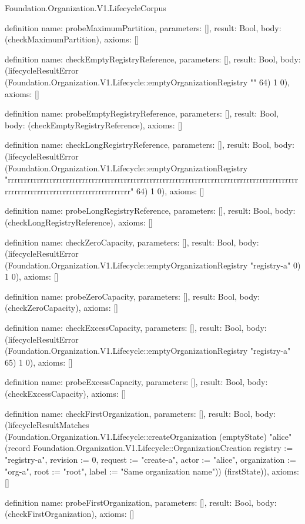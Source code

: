 \begin{lexlean}{Foundation.Organization.V1.LifecycleCorpus}
\begin{semanticmodule}
definition{
  name: probeMaximumPartition,
  parameters: [],
  result: Bool,
  body: (checkMaximumPartition),
  axioms: []
}

definition{
  name: checkEmptyRegistryReference,
  parameters: [],
  result: Bool,
  body: (lifecycleResultError (Foundation.Organization.V1.Lifecycle::emptyOrganizationRegistry "" 64) 1 0),
  axioms: []
}

definition{
  name: probeEmptyRegistryReference,
  parameters: [],
  result: Bool,
  body: (checkEmptyRegistryReference),
  axioms: []
}

definition{
  name: checkLongRegistryReference,
  parameters: [],
  result: Bool,
  body: (lifecycleResultError (Foundation.Organization.V1.Lifecycle::emptyOrganizationRegistry "rrrrrrrrrrrrrrrrrrrrrrrrrrrrrrrrrrrrrrrrrrrrrrrrrrrrrrrrrrrrrrrrrrrrrrrrrrrrrrrrrrrrrrrrrrrrrrrrrrrrrrrrrrrrrrrrrrrrrrrrrrrrrrrrr" 64) 1 0),
  axioms: []
}

definition{
  name: probeLongRegistryReference,
  parameters: [],
  result: Bool,
  body: (checkLongRegistryReference),
  axioms: []
}

definition{
  name: checkZeroCapacity,
  parameters: [],
  result: Bool,
  body: (lifecycleResultError (Foundation.Organization.V1.Lifecycle::emptyOrganizationRegistry "registry-a" 0) 1 0),
  axioms: []
}

definition{
  name: probeZeroCapacity,
  parameters: [],
  result: Bool,
  body: (checkZeroCapacity),
  axioms: []
}

definition{
  name: checkExcessCapacity,
  parameters: [],
  result: Bool,
  body: (lifecycleResultError (Foundation.Organization.V1.Lifecycle::emptyOrganizationRegistry "registry-a" 65) 1 0),
  axioms: []
}

definition{
  name: probeExcessCapacity,
  parameters: [],
  result: Bool,
  body: (checkExcessCapacity),
  axioms: []
}

definition{
  name: checkFirstOrganization,
  parameters: [],
  result: Bool,
  body: (lifecycleResultMatches (Foundation.Organization.V1.Lifecycle::createOrganization (emptyState) "alice" (record Foundation.Organization.V1.Lifecycle::OrganizationCreation {registry := "registry-a", revision := 0, request := "create-a", actor := "alice", organization := "org-a", root := "root", label := "Same organization name"})) (firstState)),
  axioms: []
}

definition{
  name: probeFirstOrganization,
  parameters: [],
  result: Bool,
  body: (checkFirstOrganization),
  axioms: []
}


\end{semanticmodule}
\end{lexlean}
